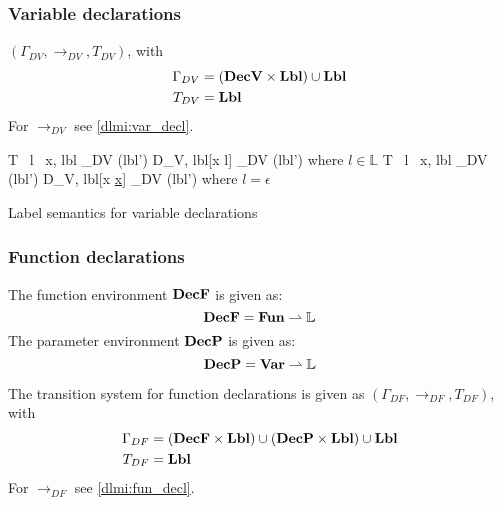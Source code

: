 \subsubsection{Variable declarations}
$(\Gamma_{DV}, \rightarrow_{DV}, T_{DV})$, with
\begin{align*}
  \Gamma_{DV} & = (\mathbf{DecV} \times \mathbf{Lbl}) \cup \mathbf{Lbl} \\
  T_{DV} & = \mathbf{Lbl} \\
\end{align*}
For $\rightarrow_{DV}$ see \cref{dlmi:var_decl}.

\begin{table}
        {\langle T \, l \, x, lbl \rangle \rightarrow_{DV} (lbl')}
        {\langle D_V, lbl[x \mapsto l] \rangle \rightarrow_{DV} (lbl')}
        {where $l \in \mathbb{L}$}
        {\langle T \, l \, x, lbl \rangle \rightarrow_{DV} (lbl')}
        {\langle D_V, lbl[x \mapsto \underline{x}] \rangle \rightarrow_{DV} (lbl')}
        {where $l = \epsilon$}
\caption{Label semantics for variable declarations}
\label{dlmi:var_decl}
\end{table}

\subsubsection{Function declarations}
The function environment $\mathbf{DecF}$ is given as:
\[ \mathbf{DecF} = \mathbf{Fun} \rightharpoonup \mathbb{L} \]
The parameter environment $\mathbf{DecP}$ is given as:
\[ \mathbf{DecP} = \mathbf{Var} \rightharpoonup \mathbb{L} \]

\noindent The transition system for function declarations is given as $(\Gamma_{DF}, \rightarrow_{DF}, T_{DF})$, with
\begin{align*}
  \Gamma_{DF} & = (\mathbf{DecF} \times \mathbf{Lbl}) \cup (\mathbf{DecP} \times \mathbf{Lbl}) \cup \mathbf{Lbl} \\
  T_{DF} & = \mathbf{Lbl}
\end{align*}
For $\rightarrow_{DF}$ see \cref{dlmi:fun_decl}.

